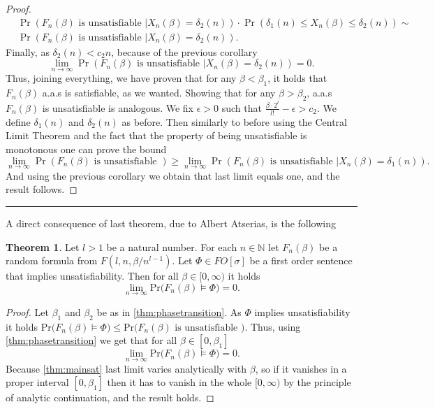 \documentclass[12pt,notitlepage,a4paper]{article}
\theoremstyle{definition}
\newtheorem{theorem}{Theorem}[section]
\newcommand{\N}{\mathbb{N}}
\newcommand{\Ln}{\lim\limits_{n\to \infty}}
\newcommand{\PR}[1]{\mathrm{Pr}\big(#1\big)}
\newcommand{\sep}{\noindent\rule{2cm}{0.4pt}}
\begin{document}
\begin{proof}
	\begin{align*}
	&\Pr \left(
	F_n(\beta) \text{ is unsatisfiable } \Big|
	X_n(\beta)=\delta_2(n) \right) \cdot 
	\Pr\left( \delta_1(n) \leq X_n(\beta)  
	\leq \delta_2(n)  \right)\sim\\&
	\Pr \left(
	F_n(\beta) \text{ is unsatisfiable } \Big|
	X_n(\beta)=\delta_2(n) \right).
	\end{align*}
	Finally, as $\delta_2(n)< c_2n$, because of the previous
	corollary
	\[
	\Ln \Pr \left(
	F_n(\beta) \text{ is unsatisfiable } \Big|
	X_n(\beta)=\delta_2(n) \right)= 0.
	\]  
	Thus, joining everything, we have proven that for any 
	$\beta < \beta_1$, it holds that
	$F_n(\beta)$ a.a.s is satisfiable, as we wanted.
	Showing that for any $\beta > \beta_2$, 
	a.a.s $F_n(\beta)$ is unsatisfiable is analogous. We
	fix $\epsilon>0$ such that $\frac{\beta\cdot 2^l}{l!}-\epsilon>c_2$.
	We define $\delta_1(n)$ and $\delta_2(n)$ as before. Then similarly to before 
	using the Central Limit Theorem and the fact that
	the property of being unsatisfiable is monotonous one can prove the bound
	\[
	\Ln \Pr \left(
	F_n(\beta) \text{ is unsatisfiable } \right) \geq
	\Ln \Pr \left(
	F_n(\beta) \text{ is unsatisfiable } \Big|
	X_n(\beta)=\delta_1(n) \right).
	\]
	And using the previous corollary we obtain that last limit equals one, 
	and the result follows. 
	
\end{proof}
\sep

A direct consequence of last theorem, due to Albert Atserias, is the following

\begin{theorem} \label{thm:satapplication}
	Let $l>1$ be a natural number.
	For each $n\in \N$ let $F_n(\beta)$ be a random formula from
	$F(l,n,\beta/n^{l-1})$. Let $\Phi\in FO[\sigma]$ be a first order
	sentence that implies unsatisfiability.  Then for all $\beta\in [0,\infty)$
	it holds
	\[
	\Ln \PR{F_n(\beta)\models \Phi  }=0.
	\]
\end{theorem}
\begin{proof}
	Let $\beta_1$ and $\beta_2$ be as in \cref{thm:phasetransition}. 
	As $\Phi$ implies unsatisfiability it holds
	$\PR{F_n(\beta)\models \Phi  }\leq  
	\PR{F_n(\beta) \text{ is unsatisfiable }  }$. Thus, using \cref{thm:phasetransition}
	we get that for all $\beta\in [0,\beta_1]$
	\[
	\Ln \PR{F_n(\beta)\models \Phi  }=0.
	\]
	Because \cref{thm:mainsat} last limit varies analytically with $\beta$, so
	if it vanishes in a proper interval $[0,\beta_1]$ then it has to vanish
	in the whole $[0,\infty)$ by the principle of analytic continuation, and the result 
	holds. 
\end{proof}
\end{document}
